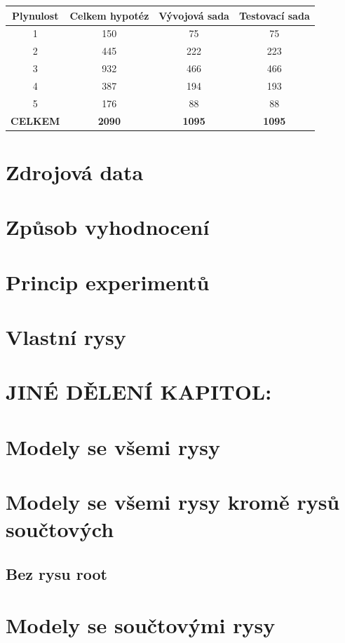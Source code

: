 \documentclass[12pt,a4paper]{report}
\begin{document}
\begin{center}\begin{tabular}{|c|c|c|c|}
	\hline
	\textbf{Plynulost} & \textbf{Celkem hypotéz} & \textbf{Vývojová sada} & \textbf{Testovací sada}\\
	\hline
	1 & 150 & 75 & 75\\
	\hline
	2 & 445 & 222 & 223\\
	\hline
	3 & 932 & 466 & 466\\
	\hline
	4 & 387 & 194 & 193\\
	\hline
	5 & 176 & 88 & 88\\
	\hline
	\hline	
	\multicolumn{1}{c}{\textbf{CELKEM}} & \multicolumn{1}{c}{\textbf{2090}} & \multicolumn{1}{c}{\textbf{1095}} & \multicolumn{1}{c}{\textbf{1095}}\\
\end{tabular}\end{center}

\section{Zdrojová data}
\section{Způsob vyhodnocení}
\section{Princip experimentů}

\section{Vlastní rysy}
\section{JINÉ DĚLENÍ KAPITOL:}
\section{Modely se všemi rysy}
\section{Modely se všemi rysy kromě rysů součtových}
\subsection{Bez rysu root}
\section{Modely se součtovými rysy}
\end{document}
